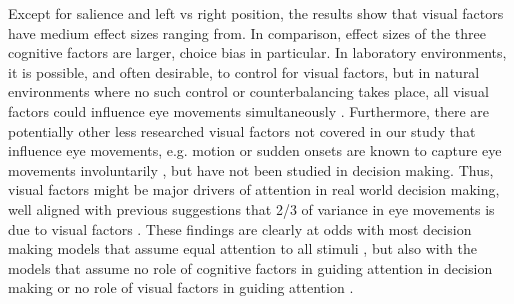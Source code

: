\documentclass[english,natbib,man,floatsintext]{apa6}
\begin{document}
Except for salience and left vs right position, the results show that visual factors have medium effect sizes ranging from. In comparison, effect sizes of the three cognitive factors are larger, choice bias in particular. In laboratory environments, it is possible, and often desirable, to control for visual factors, but in natural environments where no such control or counterbalancing takes place, all visual factors could influence eye movements simultaneously \citep{orquin2019a}. Furthermore, there are potentially other less researched visual factors not covered in our study that influence eye movements, e.g. motion or sudden onsets are known to capture eye movements involuntarily \citep{abrams2003, jonides1988}, but have not been studied in decision making. Thus, visual factors might be major drivers of attention in real world decision making, well aligned with previous suggestions that 2/3 of variance in eye movements is due to visual factors \cite{vanderlans2008}. These findings are clearly at odds with most decision making models that assume equal attention to all stimuli \citep{tversky1979,payne1988, simon1956a}, but also with the models that assume no role of cognitive factors in guiding attention in decision making \citep{busemeyer1992, krajbich2010a} or no role of visual factors in guiding attention \citep{callaway2019a, gloeckner2011a, gluth2018, gluth2020}. 
\end{document}

